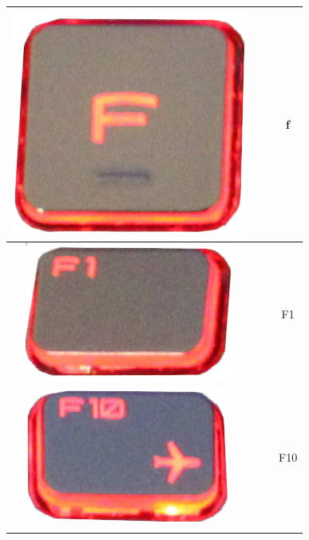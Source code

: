 \begin{longtable}{cccc}
\begin{minipage}[c]{.3\textwidth}
\includegraphics[scale=0.1]{Images/KeyMapping/f}
\vspace{0.2cm}
\end{minipage} & & & f\\
\hline
\begin{minipage}[c]{.3\textwidth}
\vspace{0.2cm}
\includegraphics[scale=0.1]{Images/KeyMapping/F1}
\vspace{0.2cm}
\end{minipage} & & & F1\\
\hline
\begin{minipage}[c]{.3\textwidth}
\vspace{0.2cm}
\includegraphics[scale=0.1]{Images/KeyMapping/F10}
\vspace{0.2cm}
\end{minipage} & & & F10\\
\hline
\begin{minipage}[c]{.3\textwidth}

\end{minipage}
\end{longtable}
